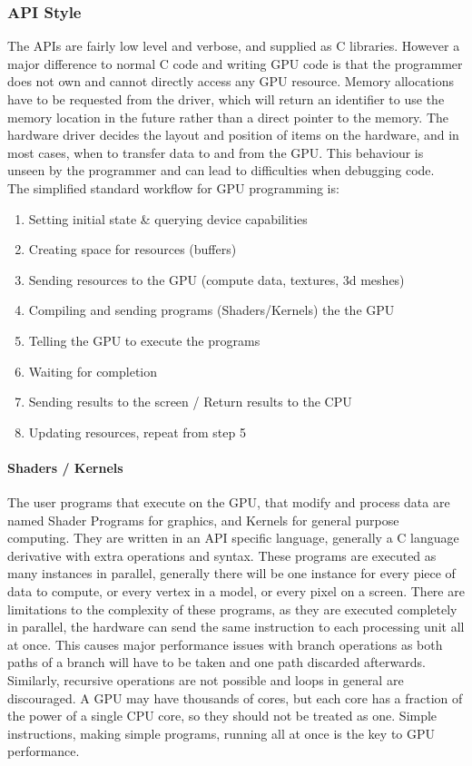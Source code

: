 \documentclass[12pt,a4paper]{article}
\begin{document}
\subsubsection{API Style}
The APIs are fairly low level and verbose, and supplied as C libraries. However a major difference to normal C code and writing GPU code is that the programmer does not own and cannot directly access any GPU resource. Memory allocations have to be requested from the driver, which will return an identifier to use the memory location in the future rather than a direct pointer to the memory. The hardware driver decides the layout and position of items on the hardware, and in most cases, when to transfer data to and from the GPU. This behaviour is unseen by the programmer and can lead to difficulties when debugging code.
\\
The simplified standard workflow for GPU programming is:
\begin{enumerate}
\item Setting initial state \& querying device capabilities
\item Creating space for resources (buffers)
\item Sending resources to the GPU (compute data, textures, 3d meshes) 
\item Compiling and sending programs (Shaders/Kernels) the the GPU 
\item Telling the GPU to execute the programs
\item Waiting for completion
\item Sending results to the screen / Return results to the CPU
\item Updating resources, repeat from step 5
\end{enumerate}

\paragraph{Shaders / Kernels}
The user programs that execute on the GPU, that modify and process data are named Shader Programs for graphics, and Kernels for general purpose computing. They are written in an API specific language, generally a C language derivative with extra operations and syntax. These programs are executed as many instances in parallel, generally there will be one instance for every piece of data to compute, or every vertex in a model, or every pixel on a screen. There are limitations to the complexity of these programs, as they are executed completely in parallel, the hardware can send the same instruction to each processing unit all at once. This causes major performance issues with branch operations as both paths of a branch will have to be taken and one path discarded afterwards. Similarly, recursive operations are not possible and loops in general are discouraged. A GPU may have thousands of cores, but each core has a fraction of the power of a single CPU core, so they should not be treated as one. Simple instructions, making simple programs, running all at once is the key to GPU performance.
\end{document}
